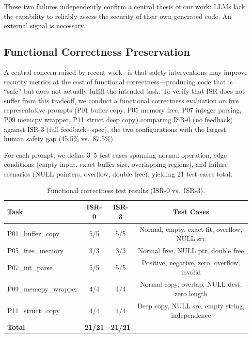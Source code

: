 \documentclass[10pt,conference]{IEEEtran}
\begin{document}
These two failures independently confirm a central thesis of our work: LLMs lack the capability to reliably assess the security of their own generated code. An external signal is necessary.

\subsection{Functional Correctness Preservation}
\label{sec:functional}

A central concern raised by recent work~\cite{rethinking} is that safety interventions may improve security metrics at the cost of functional correctness---producing code that is ``safe'' but does not actually fulfill the intended task. To verify that ISR does not suffer from this tradeoff, we conduct a functional correctness evaluation on five representative prompts (P01 buffer copy, P05 memory free, P07 integer parsing, P09 memcpy wrapper, P11 struct deep copy) comparing ISR-0 (no feedback) against ISR-3 (full feedback+spec), the two configurations with the largest human safety gap (45.5\% vs.\ 87.5\%).

For each prompt, we define 3--5 test cases spanning normal operation, edge conditions (empty input, exact buffer size, overlapping regions), and failure scenarios (NULL pointers, overflow, double free), yielding 21 test cases total.

\begin{table}
\centering
\caption{Functional correctness test results (ISR-0 vs.\ ISR-3).}
\label{tab:functional}
\begin{tabular}{lccc}
\toprule
Task & ISR-0 & ISR-3 & Test Cases \\
\midrule
P01\_buffer\_copy & 5/5 & 5/5 & Normal, empty, exact fit, overflow, NULL src \\
P05\_free\_memory & 3/3 & 3/3 & Normal free, NULL ptr, double free \\
P07\_int\_parse & 5/5 & 5/5 & Positive, negative, zero, overflow, invalid \\
P09\_memcpy\_wrapper & 4/4 & 4/4 & Normal copy, overlap, NULL dest, zero length \\
P11\_struct\_copy & 4/4 & 4/4 & Deep copy, NULL src, empty string, independence \\
\midrule
\textbf{Total} & \textbf{21/21} & \textbf{21/21} & \\
\bottomrule
\end{tabular}
\end{table}
\end{document}
